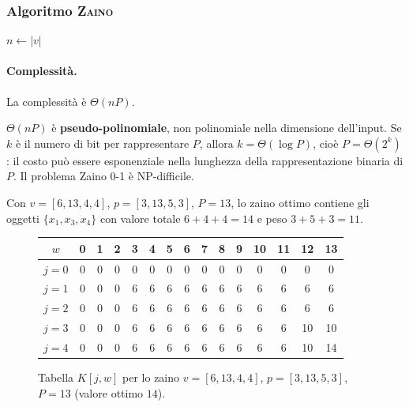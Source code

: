 \subsubsection{Algoritmo \textsc{Zaino}}

\begin{algorithm}[H]
\caption{\textsc{Zaino}$(P, p, v)$}

$n \leftarrow |v|$\;
\end{algorithm}

\paragraph{Complessità.} La complessità è $\Theta(nP)$.

\begin{hardnote}
$\Theta(nP)$ è \textbf{pseudo-polinomiale}, non polinomiale nella dimensione
dell'input. Se $k$ è il numero di bit per rappresentare $P$, allora
$k = \Theta(\log P)$, cioè $P = \Theta(2^k)$: il costo può essere esponenziale
nella lunghezza della rappresentazione binaria di $P$.
Il problema Zaino 0-1 è NP-difficile.
\end{hardnote}

\begin{esempio}[Zaino 0-1]
Con $v = [6, 13, 4, 4]$, $p = [3, 13, 5, 3]$, $P = 13$, lo zaino ottimo contiene
gli oggetti $\{x_1, x_3, x_4\}$ con valore totale $6+4+4=14$ e peso $3+5+3=11$.
\end{esempio}

\begin{figure}[H]
	\centering
	\footnotesize
	\renewcommand{\arraystretch}{1.05}
	\begin{tabular}{c|*{14}{c}}
		\toprule
		$w$ & 0 & 1 & 2 & 3 & 4 & 5 & 6 & 7 & 8 & 9 & 10 & 11 & 12 & 13 \\
		\midrule
		$j=0$ & 0 & 0 & 0 & 0 & 0 & 0 & 0 & 0 & 0 & 0 & 0 & 0 & 0 & 0 \\
		$j=1$ & 0 & 0 & 0 & 6 & 6 & 6 & 6 & 6 & 6 & 6 & 6 & 6 & 6 & 6 \\
		$j=2$ & 0 & 0 & 0 & 6 & 6 & 6 & 6 & 6 & 6 & 6 & 6 & 6 & 6 & 6 \\
		$j=3$ & 0 & 0 & 0 & 6 & 6 & 6 & 6 & 6 & 6 & 6 & 6 & 6 & 10 & 10 \\
		$j=4$ & 0 & 0 & 0 & 6 & 6 & 6 & 6 & 6 & 6 & 6 & 6 & 6 & 10 & \cellcolor{cyan!15}14 \\
		\bottomrule
	\end{tabular}
	\caption{Tabella $K[j,w]$ per lo zaino $v=[6,13,4,4]$, $p=[3,13,5,3]$, $P=13$ (valore ottimo $14$).}
\end{figure}

